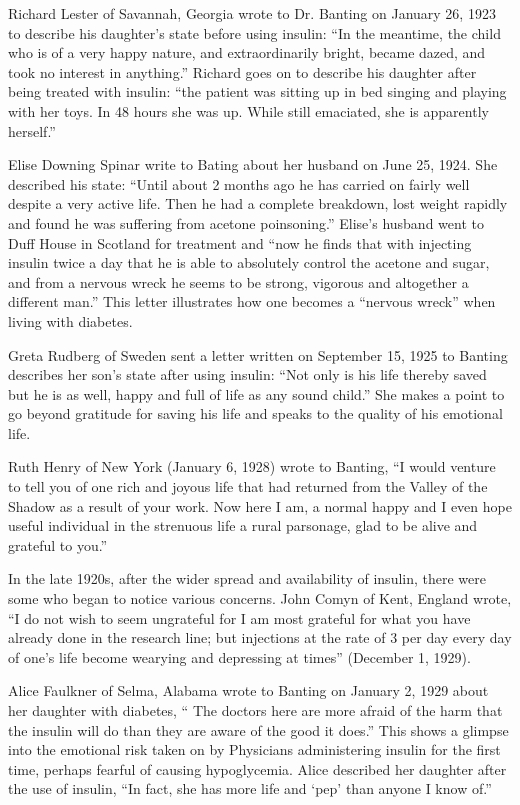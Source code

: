 \documentclass[12pt]{article}
\begin{document}
Richard Lester of Savannah, Georgia wrote to Dr. Banting on January 26, 1923 to describe his daughter's state before using insulin:
``In the meantime, the child who is of a very happy nature, and extraordinarily bright, became dazed, and took no interest in anything.''
Richard goes on to describe his daughter after being treated with insulin: ``the patient was sitting up in bed singing and playing with her toys. In 48 hours she was up. While still emaciated, she is apparently herself.'' 

Elise Downing Spinar write to Bating about her husband on June 25, 1924. She described his state:
``Until about 2 months ago he has carried on fairly well despite a very active life. Then he had a complete breakdown, lost weight rapidly and found he was suffering from acetone poinsoning.'' Elise's husband went to Duff House in Scotland for treatment and ``now he finds that with injecting insulin twice a day that he is able to absolutely control the acetone and sugar, and from a nervous wreck he seems to be strong, vigorous and altogether a different man.''
This letter illustrates how one becomes a ``nervous wreck'' when living with diabetes. 

Greta Rudberg of Sweden sent a letter written on September 15, 1925 to Banting describes her son's state after using insulin:
``Not only is his life thereby saved but he is as well, happy and full of life as any sound child.''
She makes a point to go beyond gratitude for saving his life and speaks to the quality of his emotional life. 

Ruth Henry of New York (January 6, 1928) wrote to Banting, ``I would venture to tell you of one rich and joyous life that had returned from the Valley of the Shadow as a result of your work. Now here I am, a normal happy and I even hope useful individual in the strenuous life a rural parsonage, glad to be alive and grateful to you.'' 

In the late 1920s, after the wider spread and availability of insulin, there were some who began to notice various concerns. John Comyn of Kent, England wrote, ``I do not wish to seem ungrateful for I am most grateful for what you have already done in the research line; but injections at the rate of 3 per day every day of one's life become wearying and depressing at times'' (December 1, 1929). 

Alice Faulkner of Selma, Alabama wrote to Banting on January 2, 1929 about her daughter with diabetes, `` The doctors here are more afraid of the harm that the insulin will do than they are aware of the good it does.'' This shows a glimpse into the emotional risk taken on by Physicians administering insulin for the first time, perhaps fearful of causing hypoglycemia. Alice described her daughter after the use of insulin, ``In fact, she has more life and `pep' than anyone I know of.'' 
\end{document}
